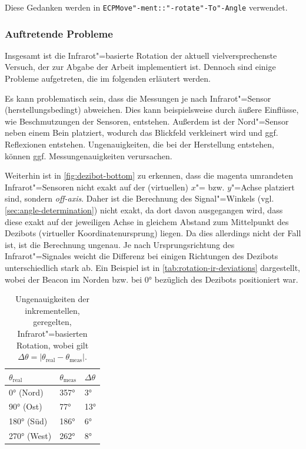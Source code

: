 Diese Gedanken werden in \texttt{ECPMove"-ment::"-rotate"-To"-Angle} verwendet.


\subsubsection{Auftretende Probleme}

Insgesamt ist die Infrarot"=basierte Rotation der aktuell vielversprechenste Versuch, der zur Abgabe der Arbeit implementiert ist.
Dennoch sind einige Probleme aufgetreten, die im folgenden erläutert werden.


Es kann problematisch sein, dass die Messungen je nach Infrarot"=Sensor (herstellungsbedingt) abweichen. Dies kann beispielsweise durch äußere Einflüsse, wie Beschmutzungen der Sensoren, entstehen. Außerdem ist der Nord"=Sensor neben einem Bein platziert, wodurch das Blickfeld verkleinert wird und ggf. Reflexionen entstehen. Ungenauigkeiten, die bei der Herstellung entstehen, können ggf. Messungenauigkeiten verursachen.


Weiterhin ist in \autoref{fig:dezibot-bottom} zu erkennen, dass die magenta umrandeten Infrarot"=Sensoren nicht exakt auf der (virtuellen) $x$"= bzw. $y$"=Achse platziert sind, sondern \emph{off-axis}. Daher ist die Berechnung des Signal"=Winkels (vgl. \autoref{sec:angle-determination}) nicht exakt, da dort davon ausgegangen wird, dass diese exakt auf der jeweiligen Achse in gleichem Abstand zum Mittelpunkt des Dezibots (virtueller Koordinatenursprung) liegen. Da dies allerdings nicht der Fall ist, ist die Berechnung ungenau. Je nach Ursprungsrichtung des Infrarot"=Signales weicht die Differenz bei einigen Richtungen des Dezibots unterschiedlich stark ab. Ein Beispiel ist in \autoref{tab:rotation-ir-deviations} dargestellt, wobei der Beacon im Norden bzw. bei 0° bezüglich des Dezibots positioniert war.

\begin{table}[h]
\centering
\begin{tabular}{l|l|l}
$\theta_{\text{real}}$ & $\theta_{\text{meas}}$ & $\Delta\theta$ \\ \hline\hline
0° (Nord)              & 357°                   & 3°             \\
90° (Ost)              & 77°                    & 13°            \\
180° (Süd)             & 186°                   & 6°             \\
270° (West)            & 262°                   & 8°                     
\end{tabular}
\caption{Ungenauigkeiten der inkrementellen, geregelten, Infrarot"=basierten Rotation, wobei gilt $\Delta\theta = \vert \theta_{\text{real}} - \theta_{\text{meas}} \vert$.}
\label{tab:rotation-ir-deviations}
\end{table}

